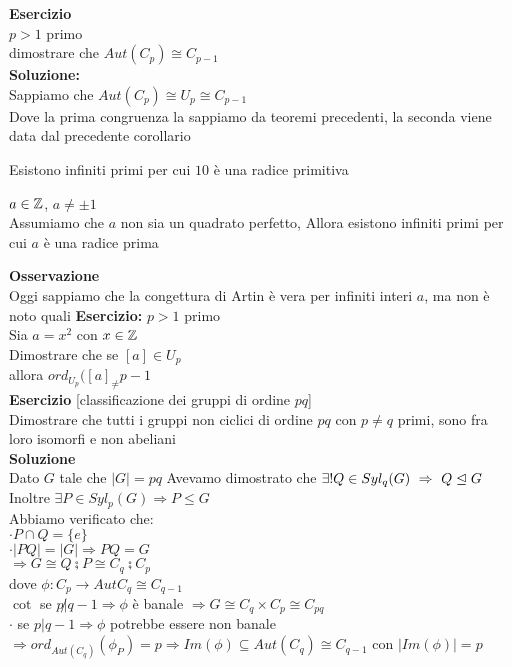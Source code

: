 \documentclass[12px]{article}
\begin{document}
\textbf{Esercizio}\\
$p> 1$ primo\\
dimostrare che  $Aut(C_p)\cong C_{p-1}$\\
\textbf{Soluzione:}\\
Sappiamo che $Aut(C_p)\cong U_p\cong C_{p-1}$\\
Dove la prima congruenza la sappiamo da teoremi precedenti, la seconda viene data dal precedente corollario\\
\begin{congettura}[Gauss, 1801]
	Esistono infiniti primi per cui $10$ è una radice primitiva
\end{congettura}
\begin{congettura}[E. Artin, 1927]
	$a\in\mathbb{Z}$,  $a\neq \pm 1$\\
	Assumiamo che  $a$ non sia un quadrato perfetto, Allora esistono infiniti primi per cui $a $ è una radice prima
\end{congettura}
\textbf{Osservazione}\\
Oggi sappiamo che la congettura di Artin è vera per infiniti interi $a$, ma non è noto quali
\textbf{Esercizio:}
$p > 1$ primo\\
Sia  $a = x^2$ con  $x\in\mathbb{Z}$\\
Dimostrare che se  $[a]\in U_p$\\
allora  $ord_{U_p}([a]_\neq p- 1$\\
\textbf{Esercizio} [classificazione dei gruppi di ordine $pq$]\\
Dimostrare che tutti i gruppi non ciclici di ordine $pq$ con  $p\neq q$ primi, sono fra loro isomorfi e non abeliani\\
\textbf{Soluzione}\\
Dato $G$ tale che $|G| = pq$
Avevamo dimostrato che $\exists ! Q\in Syl_q(G) \ \Rightarrow \ Q\trianglelefteq G$\\
Inoltre $\exists P\in Syl_p(G) \Rightarrow P\leq G$  \\
Abbiamo verificato che:\\
$\cdot P\cap Q = \{e\}$\\
 $\cdot |PQ| = |G| \Rightarrow PQ = G$ \\
 $ \Rightarrow G\cong Q\semi P \cong C_q\semi C_p$\\
 dove $\phi : C_p \rightarrow Aut C_q\cong C_{q-1}$\\
 $\cot$ se $p\not | q-1 \Rightarrow \phi$ è banale $ \Rightarrow G\cong C_q\times C_p\cong C_{pq}$\\
 $\cdot$ se $p | q-1 \Rightarrow \phi$ potrebbe essere non banale $ \Rightarrow ord_{Aut(C_q)}(\phi_P) = p \Rightarrow Im(\phi)\subseteq Aut(C_q)\cong C_{q-1}$ con $|Im(\phi)| = p$\\
\end{document}
